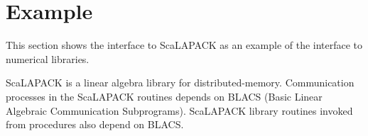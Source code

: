 %
%
%
%
%
%
%
%
%


\section{Example}

   This section shows the interface to ScaLAPACK as an example of the
   {\XMP} interface to numerical libraries.
   
   ScaLAPACK is a linear algebra library for distributed-memory.
   Communication processes in the ScaLAPACK routines depends on BLACS
   (Basic Linear Algebraic Communication Subprograms).
   ScaLAPACK library routines invoked from {\XMP} procedures also depend
   on BLACS. %


